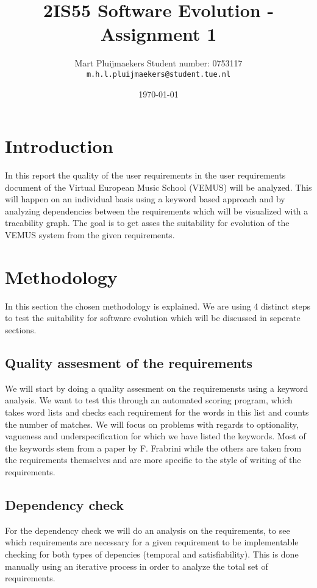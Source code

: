 \documentclass[a4paper,twoside,11pt]{article}
\title{\sffamily\bfseries 2IS55 Software Evolution - Assignment 1}
\author{Mart Pluijmaekers \qquad Student number: 0753117 \\{\tt m.h.l.pluijmaekers@student.tue.nl}}
\date{\today}
\begin{document}
\maketitle
\tableofcontents
\newpage

\section{Introduction}
In this report the quality of the user requirements in the user requirements document of the Virtual European Music School (VEMUS) will be analyzed. This will happen on an individual basis using a keyword based approach and by analyzing dependencies between the requirements which will be visualized with a tracability graph. The goal is to get asses the suitability for evolution of the VEMUS system from the given requirements. 

\section{Methodology}
In this section the chosen methodology is explained. We are using 4 distinct steps to test the suitability for software evolution which will be discussed in seperate sections. 
\subsection{Quality assesment of the requirements}
We will start by doing a quality assesment on the requiremensts using a keyword analysis. We want to test this through an automated scoring program, which takes word lists and checks each requirement for the words in this list and counts the number of matches. We will focus on problems with regards to optionality, vagueness and underspecification for which we have listed the keywords. Most of the keywords stem from a paper by F. Frabrini\cite{paper:ling_approach} while the others are taken from the requirements themselves and are more specific to the style of writing of the requirements.
\medskip


\subsection{Dependency check}
For the dependency check we will do an analysis on the requirements, to see which requirements are necessary for a given requirement to be implementable checking for both types of depencies (temporal and satisfiability). This is done manually using an iterative process in order to analyze the total set of requirements.
\end{document}
